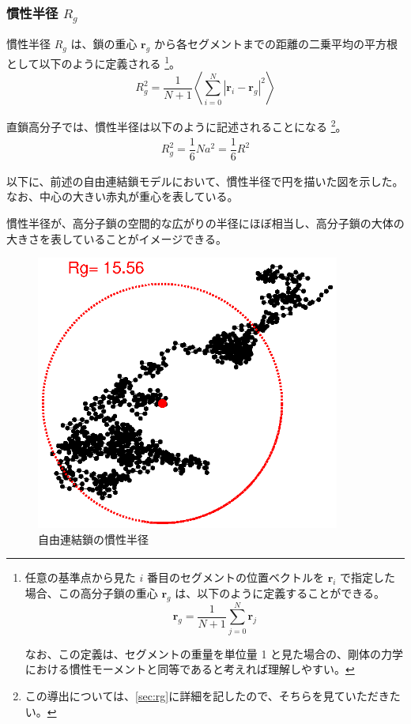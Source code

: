 \documentclass[uplatex,dvipdfmx,a4paper,11pt, titlepage]{jsarticle}
\begin{document}
\subsubsection{慣性半径 $R_g$}

慣性半径 $R_g$ は、鎖の重心 $\bm{r}_g$ から各セグメントまでの距離の二乗平均の平方根として以下のように定義される
\footnote
{
任意の基準点から見た $i$ 番目のセグメントの位置ベクトルを $\bm{r}_i$ で指定した場合、この高分子鎖の重心 $\bm{r}_g$ は、以下のように定義することができる。
\begin{equation*}
\bm{r}_g = \dfrac{1}{N+1} \sum_{j=0}^{N} \bm{r}_j
\end{equation*}

なお、この定義は、セグメントの重量を単位量 1 と見た場合の、剛体の力学における慣性モーメントと同等であると考えれば理解しやすい。
}。
\begin{equation*}
R_g^2 = \dfrac{1}{N+1} \left\langle \sum_{i=0}^{N} |\bm{r}_i - \bm{r}_g|^2 \right\rangle
\end{equation*}

直鎖高分子では、慣性半径は以下のように記述されることになる
\footnote
{
この導出については、\ref{sec:rg}に詳細を記したので、そちらを見ていただきたい。
}。
\begin{align}
R_g^2 = \dfrac{1}{6}Na^2 = \dfrac{1}{6} R^2
\label{eq:rg_r}
\end{align}

以下に、前述の自由連結鎖モデルにおいて、慣性半径で円を描いた図を示した。
なお、中心の大きい赤丸が重心を表している。

慣性半径が、高分子鎖の空間的な広がりの半径にほぼ相当し、高分子鎖の大体の大きさを表していることがイメージできる。
\begin{figure}[htb]
 \centering
	\includegraphics[width=10cm]{figure/RF_Rg.eps}
	\caption{自由連結鎖の慣性半径}
	\label{fig: RF_Rg}
\end{figure}
\end{document}
